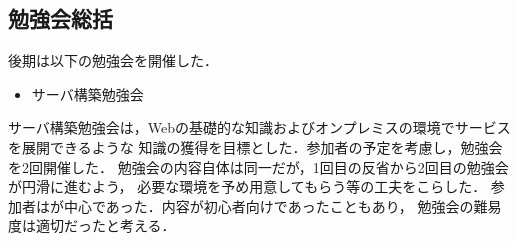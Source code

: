 \subsection*{勉強会総括}


後期は以下の勉強会を開催した．
\begin{itemize}
    \item サーバ構築勉強会
\end{itemize}

サーバ構築勉強会は，Webの基礎的な知識およびオンプレミスの環境でサービスを展開できるような
知識の獲得を目標とした．参加者の予定を考慮し，勉強会を2回開催した．
勉強会の内容自体は同一だが，1回目の反省から2回目の勉強会が円滑に進むよう，
必要な環境を予め用意してもらう等の工夫をこらした．
参加者は\firstGrade{}が中心であった．内容が初心者向けであったこともあり，
勉強会の難易度は適切だったと考える．

